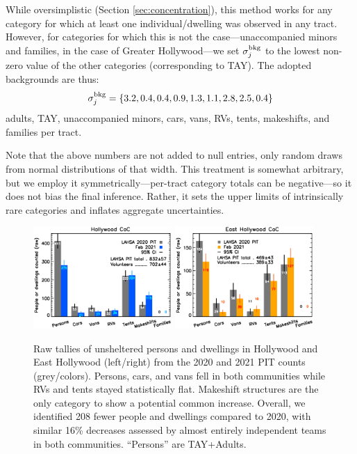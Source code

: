 \documentclass[11pt,twocolumn]{article}
\begin{document}
While oversimplistic (Section \ref{sec:concentration}), this method works for any category
for which at least one individual/dwelling was observed in any tract. However, for categories for 
which this is not the case---unaccompanied minors and families, in the
case of Greater Hollywood---we set $\sigma_{j}^{\rm bkg}$ to the lowest non-zero value of the 
other categories (corresponding to TAY). The adopted backgrounds are thus: 
\begin{equation}
	\sigma_{j}^{\rm bkg}=\{3.2, 0.4, 0.4, 0.9, 1.3, 1.1, 2.8, 2.5, 0.4\}
\end{equation}
adults, TAY, unaccompanied minors, cars, vans, RVs, tents, makeshifts, and families per tract. 

Note that the above numbers are not added to null entries, only random draws from normal distributions
of that width. This treatment is somewhat arbitrary, but we employ it symmetrically---per-tract category 
totals can be negative---so it does not bias the final inference. Rather, it sets the upper limits of intrinsically 
rare categories and inflates aggregate uncertainties.

\begin{figure}[t]
	\centering
	\includegraphics[width = 0.47\textwidth, trim = 1cm 0cm 0cm 0cm]{Hwood2021Bars}
	\includegraphics[width = 0.47\textwidth, trim = 0cm 0cm 1cm 0cm]{Eho2021Bars}
	\caption{Raw tallies of unsheltered persons and dwellings in Hollywood and East Hollywood
			(left/right) from the 2020 and 2021 PIT counts (grey/colors). Persons, cars, 
			and vans fell in both communities while RVs and tents stayed statistically flat. 
			Makeshift structures are the only category to show a potential common increase. 
			Overall, we identified 208 fewer people and dwellings compared to 2020,
			with similar 16\% decreases assessed by almost entirely independent teams
			in both communities. ``Persons'' are TAY+Adults.}
	\label{fig:rawCounts}
\end{figure}
\end{document}
